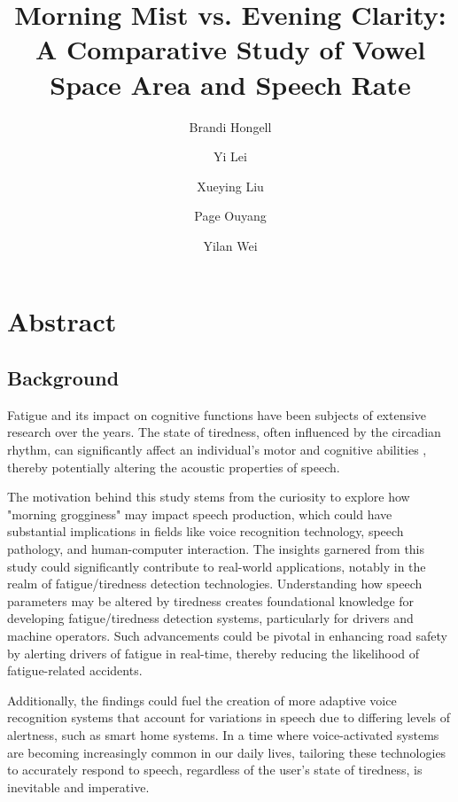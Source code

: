 \documentclass[runningheads]{llncs}
\begin{document}
%
\title{Morning Mist vs. Evening Clarity: A Comparative Study of Vowel Space Area and Speech Rate}
%
%
\author{Brandi Hongell \and
Yi Lei \and
Xueying Liu \and 
Page Ouyang \and
Yilan Wei}
%
%
%
\maketitle              %
%
%
%
\section*{Abstract}
\subsection*{Background}
\indent Fatigue and its impact on cognitive functions have been subjects of extensive research over the years. The state of tiredness, 
often influenced by the circadian rhythm, can significantly affect an individual’s motor and cognitive abilities 
\cite{zhang2015influence}, thereby potentially altering the acoustic properties of speech.

The motivation behind this study stems from the curiosity to explore how "morning grogginess" may impact speech production, which could 
have substantial implications in fields like voice recognition technology, speech pathology, and human-computer interaction. The insights 
garnered from this study could significantly contribute to real-world applications, notably in the realm of fatigue/tiredness 
detection technologies. Understanding how speech parameters may be altered by tiredness creates foundational knowledge for developing 
fatigue/tiredness detection systems, particularly for drivers and machine operators. Such advancements could be pivotal in enhancing road 
safety by alerting drivers of fatigue in real-time, thereby reducing the likelihood of fatigue-related accidents. 

Additionally, the findings could fuel the creation of more adaptive voice recognition systems that account for variations in 
speech due to differing levels of alertness, such as smart home systems. In a time where voice-activated systems are becoming increasingly 
common in our daily lives, tailoring these technologies to accurately respond to speech, regardless of the user's state of tiredness, is 
inevitable and imperative.
\end{document}
